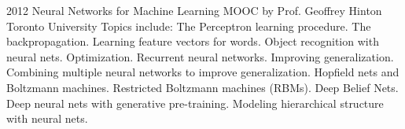 \documentclass[11pt,a4paper]{moderncv}
\begin{document}
\cventry                                                          %
    {2012}                                                          %
    {Neural Networks for Machine Learning}                                                          %
    {MOOC by Prof. Geoffrey Hinton}                                                          %
    {Toronto University}                                                          %
    {}                                                          %
    {                                                          %
        Topics include:                                                          %
            The Perceptron learning procedure.                                   %
            The backpropagation.                                                 %
            Learning feature vectors for words.                                  %
            Object recognition with neural nets.                                 %
            Optimization.                                                        %
            Recurrent neural networks.                                           %
            Improving generalization.                                            %
            Combining multiple neural networks to improve generalization.        %
            Hopfield nets and Boltzmann machines.                                %
            Restricted Boltzmann machines (RBMs).                                %
            Deep Belief Nets.                                                    %
            Deep neural nets with generative pre-training.                       %
            Modeling hierarchical structure with neural nets.                    %
    }                                                          %
\end{document}
